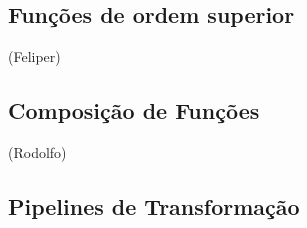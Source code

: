 \documentclass[date,twocolumn,a4paper]{ppgem}
\begin{document}
    \subsection{Funções de ordem superior}
    (Feliper)
    \subsection{Composição de Funções}
    (Rodolfo)
    \subsection{Pipelines de Transformação}
\end{document}
